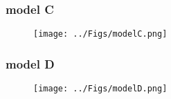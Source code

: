 \documentclass{article}
\begin{document}
\subsubsection{model C}
 \begin{figure}[H]
		\begin{center}
			\texttt{[image: ../Figs/modelC.png]}
		\end{center}
\end{figure}
\subsubsection{model D}
 \begin{figure}[H]
		\begin{center}
			\texttt{[image: ../Figs/modelD.png]}
		\end{center}
\end{figure}
 
\end{document}
